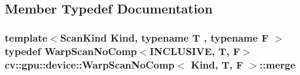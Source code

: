 \subsection{Member Typedef Documentation}
\hypertarget{structcv_1_1gpu_1_1device_1_1WarpScanNoComp_acf9dd68d2e827324390f85adf5847ae3}{
\subsubsection[{merge}]{\setlength{\rightskip}{0pt plus 5cm}template$<$Scan\-Kind Kind, typename T , typename F $>$ typedef {\bf Warp\-Scan\-No\-Comp}$<${\bf I\-N\-C\-L\-U\-S\-I\-V\-E}, {\bf T}, {\bf F}$>$ {\bf cv\-::gpu\-::device\-::\-Warp\-Scan\-No\-Comp}$<$ Kind, {\bf T}, {\bf F} $>$\-::{\bf merge}}}\label{structcv_1_1gpu_1_1device_1_1WarpScanNoComp_acf9dd68d2e827324390f85adf5847ae3}


